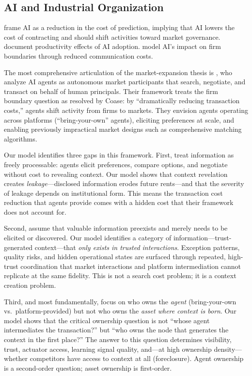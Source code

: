 \documentclass[12pt]{article}
\theoremstyle{definition}
\begin{document}
\subsection{AI and Industrial Organization}

\citet{agrawal2018} frame AI as a reduction in the cost of prediction, implying that AI lowers the cost of contracting and should shift activities toward market governance. \citet{brynjolfsson2017} document productivity effects of AI adoption. \citet{benzell2024} model AI's impact on firm boundaries through reduced communication costs.

The most comprehensive articulation of the market-expansion thesis is \citet{shahidi2025}, who analyze AI agents as autonomous market participants that search, negotiate, and transact on behalf of human principals. Their framework treats the firm boundary question as resolved by Coase: by ``dramatically reducing transaction costs,'' agents shift activity from firms to markets. They envision agents operating across platforms (``bring-your-own'' agents), eliciting preferences at scale, and enabling previously impractical market designs such as comprehensive matching algorithms.

Our model identifies three gaps in this framework. First, \citet{shahidi2025} treat information as freely processable: agents elicit preferences, compare options, and negotiate without cost to revealing context. Our model shows that context revelation creates \textit{leakage}---disclosed information erodes future rents---and that the severity of leakage depends on institutional form. This means the transaction cost reduction that agents provide comes with a hidden cost that their framework does not account for.

Second, \citet{shahidi2025} assume that valuable information preexists and merely needs to be elicited or discovered. Our model identifies a category of information---trust-generated context---that \textit{only exists in trusted interactions}. Exception patterns, quality risks, and hidden operational states are surfaced through repeated, high-trust coordination that market interactions and platform intermediation cannot replicate at the same fidelity. This is not a search cost problem; it is a context creation problem.

Third, and most fundamentally, \citet{shahidi2025} focus on who owns the \textit{agent} (bring-your-own vs.\ platform-provided) but not who owns the \textit{asset where context is born}. Our model shows that the critical ownership question is not ``whose agent intermediates the transaction?'' but ``who owns the node that generates the context in the first place?'' The answer to this question determines visibility, trust, actuator access, learning signal quality, and---at high ownership density---whether competitors have access to context at all (foreclosure). Agent ownership is a second-order question; asset ownership is first-order.
\end{document}
